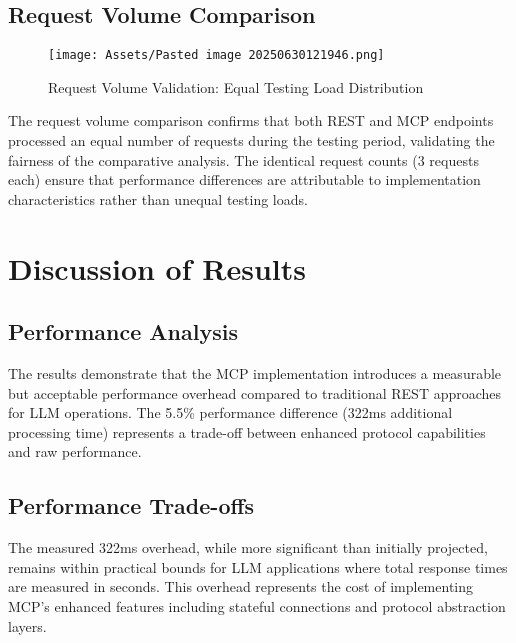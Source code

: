 \subsection{Request Volume Comparison}


\begin{figure}[h]
\centering
\texttt{[image: Assets/Pasted image 20250630121946.png]}
\caption{Request Volume Validation: Equal Testing Load Distribution}
\label{fig:request_volume_comparison}
\end{figure}

The request volume comparison confirms that both REST and MCP endpoints processed an equal number of requests during the testing period, validating the fairness of the comparative analysis. The identical request counts (3 requests each) ensure that performance differences are attributable to implementation characteristics rather than unequal testing loads.

\section{Discussion of Results}

\subsection{Performance Analysis}

The results demonstrate that the MCP implementation introduces a measurable but acceptable performance overhead compared to traditional REST approaches for LLM operations. The 5.5\% performance difference (322ms additional processing time) represents a trade-off between enhanced protocol capabilities and raw performance.

\subsection{Performance Trade-offs}

The measured 322ms overhead, while more significant than initially projected, remains within practical bounds for LLM applications where total response times are measured in seconds. This overhead represents the cost of implementing MCP's enhanced features including stateful connections and protocol abstraction layers.

